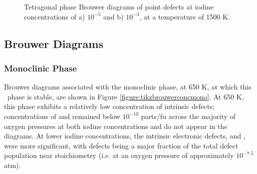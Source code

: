 \begin{figure}[htp]
\begin{center}
		\caption{Tetragonal phase Brouwer diagrams of point defects at iodine concentrations of a) $10^{-5}$ and b) $10^{-3}$, at a temperature of 1500 K.}
		\label{figure:tikzbrouwerconctet}
	\end{center}
\end{figure}

\subsection{Brouwer Diagrams} \label{Formation}

\subsubsection*{Monoclinic Phase}

Brouwer diagrams associated with the monoclinic phase, at 650 K, at which this \zirconia\ phase is stable, are shown in Figure \ref{figure:tikzbrouwerconcmono}. At 650 K, this phase exhibits a relatively low concentration of intrinsic defects; concentrations of  and  remained below $10^{-10}$ parts/fu across the majority of oxygen pressures at both iodine concentrations and do not appear in the diagrams. At lower iodine concentrations, the intrinsic electronic defects,  and , were more significant, with  defects being a major fraction of the total defect population near stoichiometry (i.e. at an oxygen pressure of approximately $10^{-7.5}$ atm). 

